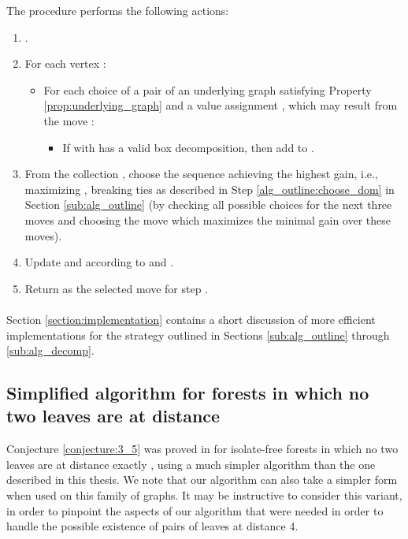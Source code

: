 \documentclass[11pt]{article}
\def\dnsitem{\vspace{-7pt}\item}
\def\dnssubitem{\vspace{-5pt}\item}
\theoremstyle{definition}
\begin{document}
The procedure  performs the following actions:
\begin{enumerate}
	\dnsitem .
	\dnsitem For each vertex :
	\begin{itemize}
		\dnsitem[] For each choice of a pair  of an underlying graph  satisfying Property \ref{prop:underlying_graph} and a value assignment , 
		which may result from the move :
		\begin{itemize}
			\dnssubitem[] If  with  has a valid box decomposition,
			then add  to .
		\end{itemize}
	\end{itemize}
	\dnsitem From the collection , 
	choose the sequence  achieving the highest gain, i.e., maximizing , breaking ties as described in Step \ref{alg_outline:choose_dom} in Section \ref{sub:alg_outline} (by checking all possible choices for the next three moves and choosing the move which maximizes the minimal gain over these moves).
	\dnsitem Update  and  according to  and .
	\dnsitem Return  as the selected move for step .
\end{enumerate}

\paragraph{}
Section \ref{section:implementation} contains a short discussion of more efficient implementations for the strategy outlined in Sections \ref{sub:alg_outline} through \ref{sub:alg_decomp}.



\subsection{Simplified algorithm for forests in which no two leaves are at distance }
\label{sub:simplified_alg_no_distance_4}

Conjecture \ref{conjecture:3_5} was proved in \cite{bujtas2015domination} for isolate-free forests in which no two leaves are at distance exactly , using a much simpler algorithm than the one described in this thesis.
We note that our algorithm can also take a simpler form when used on this family of graphs.
It may be instructive to consider this variant, in order to pinpoint the aspects of our algorithm that were needed in order to handle the possible existence of pairs of leaves at distance 4.
\end{document}
